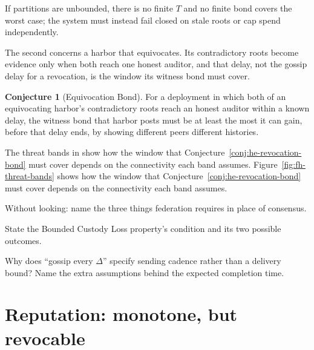 \documentclass[11pt,a4paper]{article}
\theoremstyle{definition}
\newtheorem{conjecture}{Conjecture}[section]
\theoremstyle{definition}
\theoremstyle{remark}
\begin{document}
\noindent If partitions are unbounded, there is no finite $T$ and no finite
bond covers the worst case; the system must instead fail closed on stale roots
or cap spend independently.

The second concerns a harbor that equivocates. Its contradictory roots
become evidence only when both reach one honest auditor, and that delay, not
the gossip delay for a revocation, is the window its witness bond must cover.

\begin{conjecture}[Equivocation Bond]\label{conj:he-equivocation-bond}
For a deployment in which both of an equivocating harbor's contradictory roots
reach an honest auditor within a known delay, the witness bond that harbor
posts must be at least the most it can gain, before that delay ends, by showing
different peers different histories.
\end{conjecture}

\ifpdbook
The threat bands in  show how the window
that Conjecture~\ref{conj:he-revocation-bond} must cover depends on the connectivity each
band assumes.
\else
Figure~\ref{fig:fh-threat-bands} shows how the window that
Conjecture~\ref{conj:he-revocation-bond} must cover depends on the connectivity each band
assumes.


\fi

\pdexercisepointer*{\ref{ex:he-gossip-assumptions}}{\ref{ex:he-equivocation-lower-bound}}{\pageref{ex:he-gossip-assumptions}}

\begin{pdrecitation}
\item Without looking: name the three things federation requires in place of consensus.
\item State the Bounded Custody Loss property's condition and its two possible outcomes.
\item Why does ``gossip every $\Delta$'' specify sending cadence rather than a delivery bound? Name the extra assumptions behind the expected completion time.
\end{pdrecitation}

\section{Reputation: monotone, but revocable}\label{sec:reputation}\label{sec:ic}
\end{document}
